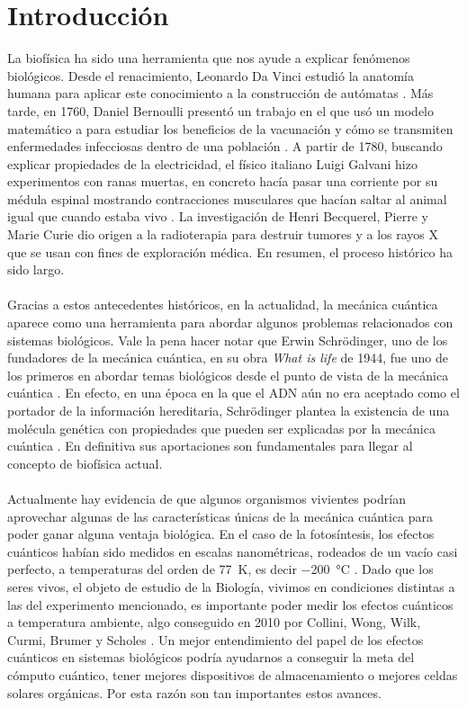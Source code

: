 \documentclass[letterpaper,12pt,oneside]{book}
\begin{document}
\tableofcontents


\newpage


\section{Introducci\'on }
La biof\'isica ha sido una herramienta que nos ayude a explicar fen\'omenos biol\'ogicos.
%
Desde el renacimiento, Leonardo Da Vinci estudi\'o la anatom\'ia humana para aplicar este conocimiento a la construcci\'on de aut\'omatas \cite{DaVinci}.  
%
M\'as tarde, en 1760, Daniel Bernoulli present\'o un trabajo en el que us\'o un modelo matem\'atico a para estudiar los beneficios de la vacunaci\'on y c\'omo se transmiten enfermedades infecciosas dentro de una poblaci\'on \cite{Bernoulli}. 
%
A partir de 1780, buscando explicar propiedades de la electricidad, el f\'isico italiano Luigi Galvani hizo experimentos con ranas muertas, en concreto hac\'ia pasar una corriente por su m\'edula espinal mostrando contracciones musculares que hac\'ian saltar al animal igual que cuando estaba vivo \cite{Galvani}. 
%
La investigaci\'on de Henri Becquerel, Pierre y Marie Curie dio origen a la radioterapia para destruir tumores y a los rayos X que se usan con fines de exploraci\'on m\'edica. En resumen, el proceso hist\'orico ha sido largo.
%
\\
\\
Gracias a estos antecedentes hist\'oricos, en la actualidad, la mec\'anica cu\'antica aparece como  una herramienta para  abordar algunos problemas relacionados con sistemas biol\'ogicos. 
%
Vale la pena hacer notar que Erwin Schr\"odinger, uno de los fundadores de la mec\'anica cu\'antica,  en su obra \textit{What is life} de 1944, fue  uno de los primeros en abordar temas biol\'ogicos desde el punto de vista de la mec\'anica cu\'antica \cite{ES}. En efecto,  en una \'epoca en la que el ADN a\'un no era aceptado como el portador de la informaci\'on hereditaria, Schr\"odinger plantea la existencia de una mol\'ecula gen\'etica con propiedades que pueden ser explicadas por la mec\'anica cu\'antica \cite{ES}. En definitiva sus aportaciones son fundamentales para llegar al concepto de biof\'isica actual.\\
%
\\
Actualmente hay evidencia de que algunos organismos vivientes podr\'ian aprovechar algunas de las caracter\'isticas \'unicas de la mec\'anica cu\'antica para poder ganar alguna ventaja biol\'ogica.
%
En el caso de la fotos\'intesis, los efectos cu\'anticos hab\'ian sido medidos en escalas nanom\'etricas, rodeados de un vac\'io casi perfecto, a temperaturas  del orden de \SI{77}{\kelvin},  es decir \SI{-200}{\celsius}  \cite{engel}. Dado que los seres vivos, el objeto de estudio de la Biolog\'ia, vivimos en condiciones distintas a las del experimento mencionado, es importante poder medir los efectos cu\'anticos a temperatura ambiente, algo conseguido en 2010 por Collini, Wong, Wilk, Curmi, Brumer y Scholes \cite{collini}. Un mejor entendimiento del papel de los efectos cu\'anticos en sistemas biol\'ogicos podr\'ia ayudarnos a conseguir la meta del c\'omputo cu\'antico, tener mejores dispositivos de almacenamiento o mejores celdas solares org\'anicas. Por esta raz\'on son tan importantes estos avances.
\end{document}
